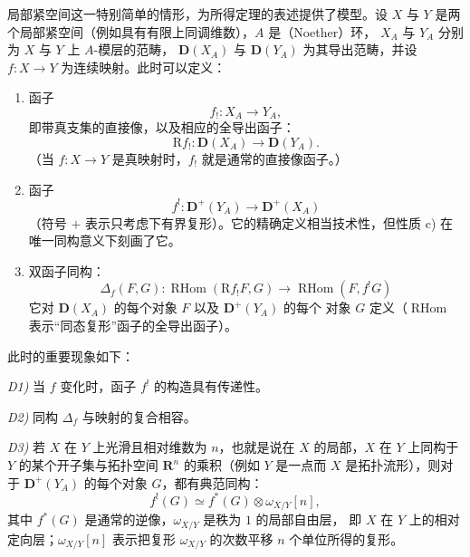 \clearpage
{}
局部紧空间这一特别简单的情形，为所得定理的表述提供了模型。设 $X$ 与 $Y$
是两个局部紧空间（例如具有有限上同调维数），$A$ 是（Noether）环，
$X_A$ 与 $Y_A$ 分别为 $X$ 与 $Y$ 上 $A$-模层的范畴，
$\mathbf D(X_A)$ 与 $\mathbf D(Y_A)$ 为其导出范畴，并设
$f\colon X\longrightarrow Y$ 为连续映射。此时可以定义：

\begin{enumerate}
\renewcommand{\labelenumi}{\alph{enumi})}
\item 函子
\[
f_!\colon X_A\longrightarrow Y_A,
\]
即带真支集的直接像，以及相应的全导出函子：
\[
\mathrm Rf_!\colon \mathbf D(X_A)\longrightarrow \mathbf D(Y_A).
\]
（当 $f\colon X\longrightarrow Y$ 是真映射时，$f_!$ 就是通常的直接像函子。）

\item 函子
\[
f^!\colon \mathbf D^+(Y_A)\longrightarrow \mathbf D^+(X_A)
\]
（符号 $+$ 表示只考虑下有界复形）。它的精确定义相当技术性，但性质 c)
在唯一同构意义下刻画了它。

\item 双函子同构：
\[
\Delta_f(F,G)\colon
\operatorname{RHom}(\mathrm Rf_!F,G)
\longrightarrow
\operatorname{RHom}(F,f^!G)
\]
它对 $\mathbf D(X_A)$ 的每个对象 $F$ 以及 $\mathbf D^+(Y_A)$ 的每个
对象 $G$ 定义（$\operatorname{RHom}$ 表示“同态复形”函子的全导出函子）。
\end{enumerate}

此时的重要现象如下：

\noindent\textit{D1)} 当 $f$ 变化时，函子 $f^!$ 的构造具有传递性。

\noindent\textit{D2)} 同构 $\Delta_f$ 与映射的复合相容。

\noindent\textit{D3)} 若 $X$ 在 $Y$ 上光滑且相对维数为 $n$，也就是说在
$X$ 的局部，$X$ 在 $Y$ 上同构于 $Y$ 的某个开子集与拓扑空间
$\mathbf R^n$ 的乘积（例如 $Y$ 是一点而 $X$ 是拓扑流形），则对于
$\mathbf D^+(Y_A)$ 的每个对象 $G$，都有典范同构：
\[
f^!(G)\simeq f^*(G)\otimes\omega_{X/Y}[n],
\]
其中 $f^*(G)$ 是通常的逆像，$\omega_{X/Y}$ 是秩为 $1$ 的局部自由层，
即 $X$ 在 $Y$ 上的相对定向层；$\omega_{X/Y}[n]$ 表示把复形
$\omega_{X/Y}$ 的次数平移 $n$ 个单位所得的复形。
